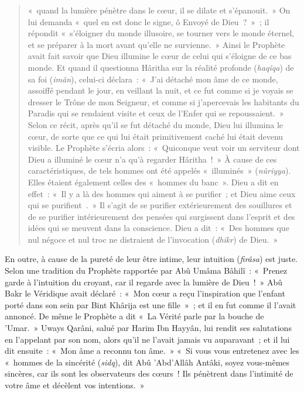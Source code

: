 \begin{quote}
«~quand la lumière pénètre dans
le cœur, il se dilate et s'épanouit.~» On lui demanda «~quel en est donc
le signe, ô Envoyé de Dieu~?~»~; il répondit «~s'éloigner du monde
illusoire, se tourner vers le monde éternel, et se préparer à la mort
avant qu'elle ne survienne.~»    Ainsi le Prophète avait fait savoir que
Dieu illumine le cœur de celui qui s'éloigne de ce bas monde. Et quand
il questionna Hâritha sur la réalité profonde (\emph{haqîqa}) de sa foi
(\emph{imân}), celui-ci déclara~: «~J'ai détaché mon âme de ce monde,
assoiffé pendant le jour, en veillant la nuit, et ce fut comme si je
voyais se dresser le Trône de mon Seigneur, et comme si j'apercevais les
habitants du Paradis qui se rendaient visite et ceux de l'Enfer qui se
repoussaient.~» Selon ce récit, après qu'il se fut détaché du monde,
Dieu lui illumina le cœur, de sorte que ce qui lui était primitivement
caché lui était devenu visible. Le Prophète s'écria alors~: «~Quiconque
veut voir un serviteur dont Dieu a illuminé le cœur n'a qu'à regarder
Hâritha~!~» À cause de ces caractéristiques, de tels hommes ont été
appelés «~illuminés~» (\emph{nûriyya}). Elles étaient également celles
des «~hommes du banc~». Dieu a dit en effet~: «~Il y a là des hommes qui
aiment à se purifier~; et Dieu aime ceux qui se purifient~.~» Il s'agit
de se purifier extérieurement des souillures et de se purifier
intérieurement des pensées qui surgissent dans l'esprit et des idées qui
se meuvent dans la conscience. Dieu a dit~: «~Des hommes que nul négoce
et nul troc ne distraient de l'invocation (\emph{dhikr}) de Dieu.~»
\end{quote}
 

En outre, à cause de la pureté de leur être intime, leur intuition
(\emph{firâsa}) est juste. Selon une tradition du Prophète rapportée par
Abû Umâma Bâhilî~: «~Prenez garde à l'intuition du croyant, car il
regarde avec la lumière de Dieu~!~» Abû Bakr le Véridique avait
déclaré~: «~Mon cœur a reçu l'inspiration que l'enfant porté dans son
sein par Bint Khârija est une fille~»~; et il en fut comme il l'avait
annoncé. De même le Prophète a dit «~La Vérité parle par la bouche de
'Umar.~» Uways Qarâni, salué par Harim Ibn Hayyân, lui rendit ses
salutations en l'appelant par son nom, alors qu'il ne l'avait jamais vu
auparavant~; et il lui dit ensuite~: «~Mon âme a reconnu ton âme.~» «~Si
vous vous entretenez avec les «~hommes de la sincérité (\emph{sidq}),
dit Abû 'Abd'Allâh Antâki, soyez vous-mêmes sincères, car ils sont les
observateurs des cœurs~! Ils pénètrent dans l'intimité de votre âme et
décèlent vos intentions.~»

